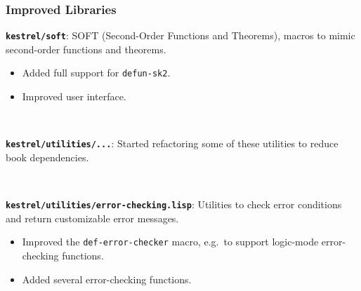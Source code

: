 \documentclass{beamer}
\newcommand{\code}[1]{\texttt{#1}}
\newcommand{\bookpath}[1]{\textbf{\code{#1}}}
\newcommand{\implibtitle}{\frametitle{Improved Libraries}}
\begin{document}
\begin{frame}

\implibtitle

\bookpath{kestrel/soft}:
SOFT (Second-Order Functions and Theorems),
macros to mimic second-order functions and theorems.
\begin{itemize}
\item
Added full support for \code{defun-sk2}.
\item
Improved user interface.
\end{itemize}

\

\bookpath{kestrel/utilities/...}:
Started refactoring some of these utilities to reduce book dependencies.

\

\bookpath{kestrel/utilities/error-checking.lisp}:
Utilities to check error conditions and return customizable error messages.
\begin{itemize}
\item
Improved the \code{def-error-checker} macro,
e.g.\ to support logic-mode error-checking functions.
\item
Added several error-checking functions.
\end{itemize}

\end{frame}

\end{document}
